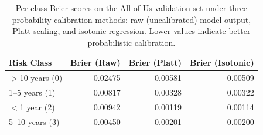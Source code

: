 \documentclass{article}
\begin{document}
\begin{table}[h]
\caption{Per-class Brier scores on the All of Us validation set under three probability calibration methods: raw (uncalibrated) model output, Platt scaling, and isotonic regression. Lower values indicate better probabilistic calibration.}
\label{tab:aou_brier}
\begin{adjustbox}{max width=\textwidth}
\begin{tabular}{lrrr}
\toprule
Risk Class & Brier (Raw) & Brier (Platt) & Brier (Isotonic) \\
\midrule
$>$10 years (0) & 0.02475 & 0.00581 & 0.00509 \\
1--5 years (1)  & 0.00817 & 0.00328 & 0.00322 \\
$<$1 year (2)   & 0.00942 & 0.00119 & 0.00114 \\
5--10 years (3) & 0.00450 & 0.00201 & 0.00200 \\
\bottomrule
\end{tabular}
\end{adjustbox}
\end{table}

\begin{table}
\caption{Brier score per risk class for BEHRT-LoRA, XGBoost, and Neural Network 
on the All of Us test set (raw softmax/softprob probabilities, no calibration), 
grouped by clinical risk category. 
Baseline Brier $= p(1-p)$ for class prevalence $p$. Lower is better. 
BEHRT-LoRA evaluated on a stratified 50K subsample; XGBoost and NN on the full test set ($N=98{,}249$).}
\label{tab:aou_brier_raw_comparison}
\end{table}
\end{document}
